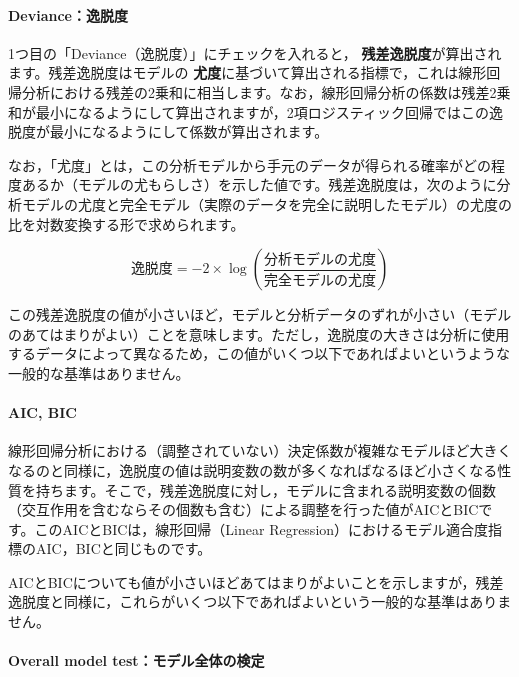 \documentclass[
  12pt,
  a5jpaper,
  lualatex, ja=standard]{bxjsbook}
\renewcommand{\emph}[1]{\textbf{\color{emph} #1}}
\begin{document}
\hypertarget{devianceux9038ux8131ux5ea6}{%
\paragraph*{Deviance：逸脱度}\label{devianceux9038ux8131ux5ea6}}

1つ目の「Deviance（逸脱度）」にチェックを入れると，\emph{残差逸脱度}が算出されます。残差逸脱度はモデルの\emph{尤度}に基づいて算出される指標で，これは線形回帰分析における残差の2乗和に相当します。なお，線形回帰分析の係数は残差2乗和が最小になるようにして算出されますが，2項ロジスティック回帰ではこの逸脱度が最小になるようにして係数が算出されます。

なお，「尤度」とは，この分析モデルから手元のデータが得られる確率がどの程度あるか（モデルの尤もらしさ）を示した値です。残差逸脱度は，次のように分析モデルの尤度と完全モデル（実際のデータを完全に説明したモデル）の尤度の比を対数変換する形で求められます。

\[
\text{逸脱度} = -2\times\log \left(\frac{\text{分析モデルの尤度}}{\text{完全モデルの尤度}}\right)
\]

この残差逸脱度の値が小さいほど，モデルと分析データのずれが小さい（モデルのあてはまりがよい）ことを意味します。ただし，逸脱度の大きさは分析に使用するデータによって異なるため，この値がいくつ以下であればよいというような一般的な基準はありません。

\hypertarget{aic-bic}{%
\paragraph*{AIC, BIC}\label{aic-bic}}

線形回帰分析における（調整されていない）決定係数が複雑なモデルほど大きくなるのと同様に，逸脱度の値は説明変数の数が多くなればなるほど小さくなる性質を持ちます。そこで，残差逸脱度に対し，モデルに含まれる説明変数の個数（交互作用を含むならその個数も含む）による調整を行った値がAICとBICです。このAICとBICは，線形回帰（Linear Regression）におけるモデル適合度指標のAIC，BICと同じものです。

AICとBICについても値が小さいほどあてはまりがよいことを示しますが，残差逸脱度と同様に，これらがいくつ以下であればよいという一般的な基準はありません。

\hypertarget{overall-model-testux30e2ux30c7ux30ebux5168ux4f53ux306eux691cux5b9a-1}{%
\paragraph*{Overall model test：モデル全体の検定}\label{overall-model-testux30e2ux30c7ux30ebux5168ux4f53ux306eux691cux5b9a-1}}
\end{document}
